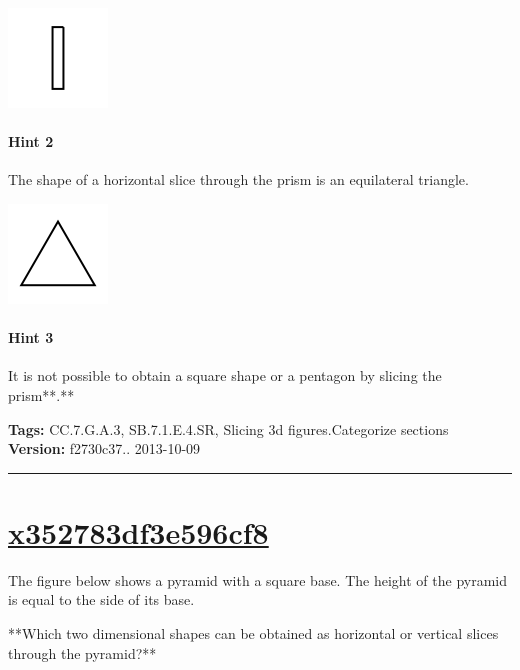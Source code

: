 \documentclass[twocolumn,10pt]{article}
\def\shrinkfactor{0.4}
\begin{document}
\includegraphics[scale=\shrinkfactor]{figures/ef45ed2bac2d4bba3b359503260d04f6028634cd.png} 


\paragraph{Hint 2}The shape of a horizontal slice through the prism is an equilateral triangle.    

\includegraphics[scale=\shrinkfactor]{figures/15c855a8a232e6c1873c5f46769050a9c13051b8.png}

\paragraph{Hint 3}It is not possible to obtain a square shape or a pentagon by slicing the prism**.**




\medskip
\noindent
\textbf{Tags:} {\footnotesize CC.7.G.A.3, SB.7.1.E.4.SR, Slicing 3d figures.Categorize sections}\\
\textbf{Version:} f2730c37.. 2013-10-09
\smallskip\hrule





\section{\href{https://www.khanacademy.org/devadmin/content/items/x352783df3e596cf8}{x352783df3e596cf8}}

\noindent
The figure below shows a pyramid with a square base. The height of the pyramid is equal to the side of its base. 

**Which two dimensional shapes can be obtained as  horizontal or vertical slices through the pyramid?**  
\end{document}
